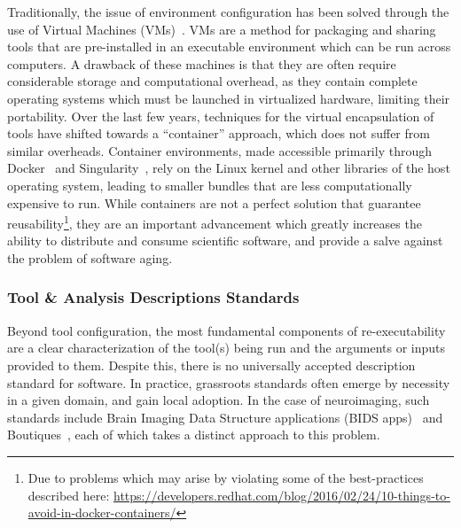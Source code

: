 Traditionally, the issue of environment configuration has been solved through the use of Virtual Machines
(VMs)~\cite{smith2005virtual}. VMs are a method for packaging and sharing tools that are pre-installed in an executable
environment which can be run across computers. A drawback of these machines is that they are often require considerable
storage and computational overhead, as they contain complete operating systems which must be launched in virtualized
hardware, limiting their portability. Over the last few years, techniques for the virtual encapsulation of tools have
shifted towards a ``container'' approach, which does not suffer from similar overheads. Container environments,
made accessible primarily through Docker~\cite{merkel2014docker} and Singularity~\cite{kurtzer2017singularity}, rely on
the Linux kernel and other libraries of the host operating system, leading to smaller bundles that are less computationally
expensive to run. While containers are not a perfect solution that guarantee reusability\footnote{Due to problems which
may arise by violating some of the best-practices described here:
\url{https://developers.redhat.com/blog/2016/02/24/10-things-to-avoid-in-docker-containers/}}, they are an important
advancement which greatly increases the ability to distribute and consume scientific software, and provide a salve
against the problem of software aging.

\subsubsection{Tool \& Analysis Descriptions Standards}
Beyond tool configuration, the most fundamental components of re-executability are a clear characterization of the
tool(s) being run and the arguments or inputs provided to them. Despite this, there is no universally accepted
description standard for software. In practice, grassroots standards often emerge by necessity in a given domain, and
gain local adoption. In the case of neuroimaging, such standards include Brain Imaging Data Structure applications
(BIDS apps)~\cite{gorgolewski2017bids} and Boutiques~\cite{Glatard2018-tu}, each of which takes a distinct approach to
this problem.

